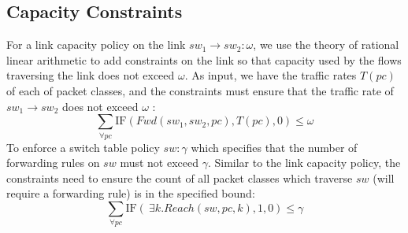\subsection{Capacity Constraints} \label{sec:linkcap}
For a link capacity policy on the link $sw_1 \rightarrow sw_2: \omega$, we use the theory of rational linear arithmetic to add constraints on the link so that capacity used by the flows traversing the link does not exceed $\omega$. As input, we have the traffic rates $T(pc)$ of
each of packet classes, and the constraints must ensure that the traffic rate of $sw_1 \rightarrow sw_2$
does not exceed $\omega$ :
\begin{equation}
 \sum_{\forall pc} \text{IF}(Fwd(sw_1,sw_2, pc), T(pc), 0) \leq \omega 
\end{equation}
To enforce a switch table policy $sw : \gamma$ which specifies that the number of forwarding 
rules on $sw$ must not exceed $\gamma$. Similar to the link capacity policy,
the constraints need to ensure the count of all packet classes which traverse $sw$ (will require 
a forwarding rule) is in the specified bound:
\begin{equation}
\sum_{\forall pc} \text{IF}(~\exists k. Reach(sw,pc,k), 1, 0)  \leq \gamma
\end{equation}

